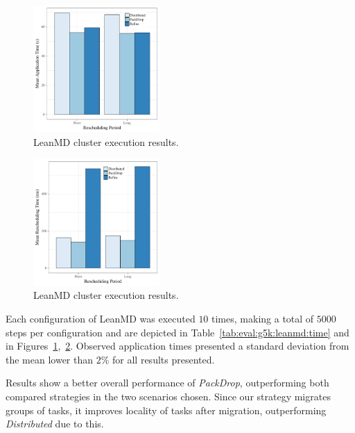 \begin{figure}[!ht]
	\centering
    \includegraphics[width=0.43\textwidth]{images/apptime_leanmd_g5k.pdf}
	\caption{LeanMD cluster execution results.}
    \label{fig:eval:g5k:leanmd:time}
\end{figure}


\begin{figure}[!t]
	\centering
    \includegraphics[width=0.43\textwidth]{images/schedtime_leanmd_g5k.pdf}
	\caption{LeanMD cluster execution results.}
    \label{fig:eval:g5k:leanmd:schedtime}
\end{figure}

Each configuration of LeanMD was executed $10$ times, making a total of $5000$ steps per configuration and are depicted in Table~\ref{tab:eval:g5k:leanmd:time} and in Figures~\ref{fig:eval:g5k:leanmd:time},~\ref{fig:eval:g5k:leanmd:schedtime}.
Observed application times presented a standard deviation from the mean lower than $2\%$ for all results presented.

Results show a better overall performance of \textit{PackDrop}, outperforming both compared strategies in the two scenarios chosen.
Since our strategy migrates groups of tasks, it improves locality of tasks after migration, outperforming \textit{Distributed} due to this.

